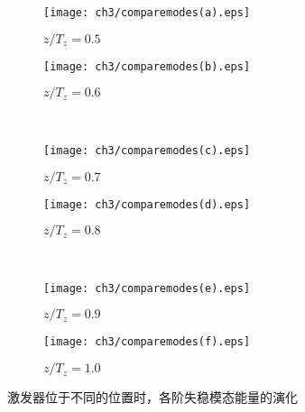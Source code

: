 \begin{figure}[H]
    \centering
    \begin{subfigure}{0.45\textwidth}           %
        \texttt{[image: ch3/comparemodes(a).eps]}
        \caption{$z/T_z = 0.5$}\label{f:a}
    \end{subfigure}
    \begin{subfigure}{0.45\textwidth}           %
        \texttt{[image: ch3/comparemodes(b).eps]}
        \caption{$z/T_z = 0.6$}\label{f:b}
    \end{subfigure}
    \\ \bigskip
    \begin{subfigure}{0.45\textwidth}         %
        \texttt{[image: ch3/comparemodes(c).eps]}
        \caption{$z/T_z = 0.7$}\label{f:c}
    \end{subfigure}
    \begin{subfigure}{0.45\textwidth}          %
        \texttt{[image: ch3/comparemodes(d).eps]}
        \caption{$z/T_z = 0.8$}\label{f:d}
    \end{subfigure}
    \\ \bigskip
    \begin{subfigure}{0.45\textwidth}         %
        \texttt{[image: ch3/comparemodes(e).eps]}
        \caption{$z/T_z = 0.9$}\label{f:e}
    \end{subfigure}
    \begin{subfigure}{0.45\textwidth}          %
        \texttt{[image: ch3/comparemodes(f).eps]}
        \caption{$z/T_z = 1.0$}\label{f:f}
    \end{subfigure}
    \caption{激发器位于不同的位置时，各阶失稳模态能量的演化}
    \label{f:spanwiseeffect} %
\end{figure}
